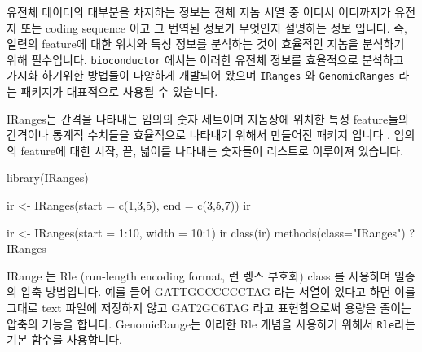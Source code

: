\documentclass[
]{book}
\newenvironment{Shaded}{\begin{snugshade}}{\end{snugshade}}
\newcommand{\AttributeTok}[1]{\textcolor[rgb]{0.77,0.63,0.00}{#1}}
\newcommand{\DecValTok}[1]{\textcolor[rgb]{0.00,0.00,0.81}{#1}}
\newcommand{\FunctionTok}[1]{\textcolor[rgb]{0.00,0.00,0.00}{#1}}
\newcommand{\NormalTok}[1]{#1}
\newcommand{\OtherTok}[1]{\textcolor[rgb]{0.56,0.35,0.01}{#1}}
\newcommand{\SpecialCharTok}[1]{\textcolor[rgb]{0.00,0.00,0.00}{#1}}
\newcommand{\StringTok}[1]{\textcolor[rgb]{0.31,0.60,0.02}{#1}}
\begin{document}
유전체 데이터의 대부분을 차지하는 정보는 전체 지놈 서열 중 어디서 어디까지가 유전자 또는 coding sequence 이고 그 번역된 정보가 무엇인지 설명하는 정보 입니다. 즉, 일련의 feature에 대한 위치와 특성 정보를 분석하는 것이 효율적인 지놈을 분석하기 위해 필수입니다. \texttt{bioconductor} 에서는 이러한 유전체 정보를 효율적으로 분석하고 가시화 하기위한 방법들이 다양하게 개발되어 왔으며 \texttt{IRanges} 와 \texttt{GenomicRanges} 라는 패키지가 대표적으로 사용될 수 있습니다.

IRanges는 간격을 나타내는 임의의 숫자 세트이며 지놈상에 위치한 특정 feature들의 간격이나 통계적 수치들을 효율적으로 나타내기 위해서 만들어진 패키지 입니다 \citep{Lawrence2013}. 임의의 feature에 대한 시작, 끝, 넓이를 나타내는 숫자들이 리스트로 이루어져 있습니다.

\begin{Shaded}
\begin{Highlighting}[]
\FunctionTok{library}\NormalTok{(IRanges)}

\NormalTok{ir }\OtherTok{\textless{}{-}} \FunctionTok{IRanges}\NormalTok{(}\AttributeTok{start =} \FunctionTok{c}\NormalTok{(}\DecValTok{1}\NormalTok{,}\DecValTok{3}\NormalTok{,}\DecValTok{5}\NormalTok{), }\AttributeTok{end =} \FunctionTok{c}\NormalTok{(}\DecValTok{3}\NormalTok{,}\DecValTok{5}\NormalTok{,}\DecValTok{7}\NormalTok{))}
\NormalTok{ir}

\NormalTok{ir }\OtherTok{\textless{}{-}} \FunctionTok{IRanges}\NormalTok{(}\AttributeTok{start =} \DecValTok{1}\SpecialCharTok{:}\DecValTok{10}\NormalTok{, }\AttributeTok{width =} \DecValTok{10}\SpecialCharTok{:}\DecValTok{1}\NormalTok{)}
\NormalTok{ir}
\FunctionTok{class}\NormalTok{(ir)}
\FunctionTok{methods}\NormalTok{(}\AttributeTok{class=}\StringTok{"IRanges"}\NormalTok{)}
\NormalTok{?IRanges}
\end{Highlighting}
\end{Shaded}

IRange 는 Rle (run-length encoding format, 런 렝스 부호화) class 를 사용하며 일종의 압축 방법입니다. 예를 들어 GATTGCCCCCCTAG 라는 서열이 있다고 하면 이를 그대로 text 파일에 저장하지 않고 GAT2GC6TAG 라고 표현함으로써 용량을 줄이는 압축의 기능을 합니다. GenomicRange는 이러한 Rle 개념을 사용하기 위해서 \texttt{Rle}라는 기본 함수를 사용합니다.
\end{document}
